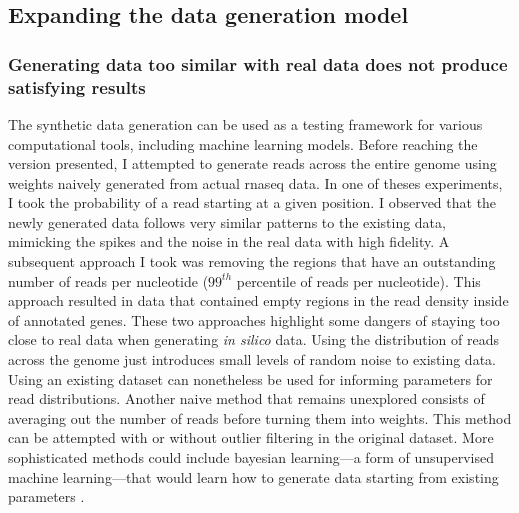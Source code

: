 \documentclass[12pt]{article}
\begin{document}
\subsection{Expanding the data generation model}

\subsubsection{Generating data too similar with real data does not produce satisfying results}
The synthetic data generation can be used as a testing framework for various computational tools, including machine learning models. Before reaching the version presented, I attempted to generate reads across the entire genome using weights naively generated from actual \acrshort{rnaseq} data. In one of theses experiments, I took the probability of a read starting at a given position. I observed that the newly generated data follows very similar patterns to the existing data, mimicking the spikes and the noise in the real data with high fidelity. A subsequent approach I took was removing the regions that have an outstanding number of reads per nucleotide ($99^{th}$ percentile of reads per nucleotide). This approach resulted in data that contained empty regions in the read density inside of annotated genes. These two approaches highlight some dangers of staying too close to real data when generating \textit{in silico} data. Using the distribution of reads across the genome just introduces small levels of random noise to existing data. Using an existing dataset can nonetheless be used for informing parameters for read distributions. Another naive method that remains unexplored consists of averaging out the number of reads before turning them into weights. This method can be attempted with or without outlier filtering in the original dataset. More sophisticated methods could include bayesian learning---a form of unsupervised machine learning---that would learn how to generate data starting from existing parameters \cite{Sauta2020}.
\end{document}
